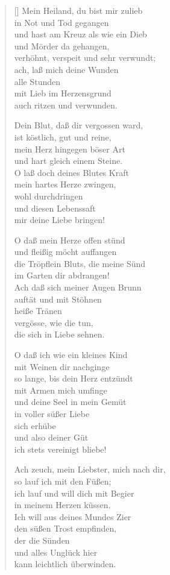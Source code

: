 \begin{multicols}{2}
\begin{verse}[\versewidth]
 Mein Heiland, du bist mir zulieb\\
in Not und Tod gegangen\\
und hast am Kreuz als wie ein Dieb\\
und Mörder da gehangen,\\
verhöhnt, verspeit und sehr verwundt;\\
ach, laß mich deine Wunden\\
alle Stunden\\
mit Lieb im Herzensgrund\\
auch ritzen und verwunden.

 Dein Blut, daß dir vergossen ward,\\
ist köstlich, gut und reine,\\
mein Herz hingegen böser Art\\
und hart gleich einem Steine.\\
O laß doch deines Blutes Kraft\\
mein hartes Herze zwingen,\\
wohl durchdringen\\
und diesen Lebenssaft\\
mir deine Liebe bringen!

\vfill\null
\columnbreak

 O daß mein Herze offen stünd\\
und fleißig möcht auffangen\\
die Tröpflein Bluts, die meine Sünd\\
im Garten dir abdrangen!\\
Ach daß sich meiner Augen Brunn\\
auftät und mit Stöhnen\\
heiße Tränen\\
vergösse, wie die tun,\\
die sich in Liebe sehnen.

 O daß ich wie ein kleines Kind\\
mit Weinen dir nachginge\\
so lange, bis dein Herz entzündt\\
mit Armen mich umfinge\\
und deine Seel in mein Gemüt\\
in voller süßer Liebe\\
sich erhübe\\
und also deiner Güt\\
ich stets vereinigt bliebe!

 Ach zeuch, mein Liebster, mich nach dir,\\
so lauf ich mit den Füßen;\\
ich lauf und will dich mit Begier\\
in meinem Herzen küssen.\\
Ich will aus deines Mundes Zier\\
den süßen Trost empfinden,\\
der die Sünden\\
und alles Unglück hier\\
kann leichtlich überwinden.


\end{verse}
\end{multicols}

